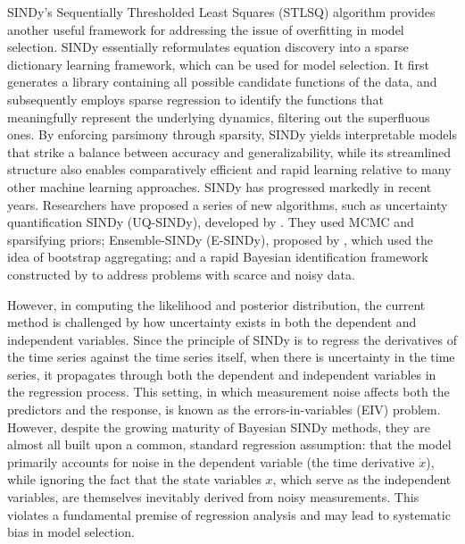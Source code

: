 SINDy’s Sequentially Thresholded Least Squares (STLSQ) algorithm provides another useful framework for addressing the issue of overfitting in model selection. SINDy essentially reformulates equation discovery into a sparse dictionary learning framework, which can be used for model selection. 
It first generates a library containing all possible candidate functions of the data, and subsequently employs sparse regression to identify the functions that meaningfully represent the underlying dynamics, filtering out the superfluous ones. By enforcing parsimony through sparsity, SINDy yields interpretable models that strike a balance between accuracy and generalizability, while its streamlined structure also enables comparatively efficient and rapid learning relative to many other machine learning approaches.
SINDy has progressed markedly in recent years. Researchers have proposed a series of new algorithms, such as uncertainty quantification SINDy (UQ-SINDy), developed by \cite{hirsh2022}. They used MCMC and sparsifying priors; Ensemble-SINDy (E-SINDy), proposed by \cite{fasel2022}, which used the idea of bootstrap aggregating; and a rapid Bayesian identification framework constructed by \cite{fung2024} to address problems with scarce and noisy data. 


However, in computing the likelihood and posterior distribution, the current method is challenged by how uncertainty exists in both the dependent and independent variables. Since the principle of SINDy is to regress the derivatives of the time series against the time series itself, when there is uncertainty in the time series, it propagates through both the dependent and independent variables in the regression process. This setting, in which measurement noise affects both the predictors and the response, is known as the errors-in-variables (EIV) problem. 
However, despite the growing maturity of Bayesian SINDy methods, they are almost all built upon a common, standard regression assumption: that the model primarily accounts for noise in the dependent variable (the time derivative $\dot{x} $), while ignoring the fact that the state variables $x$, which serve as the independent variables, are themselves inevitably derived from noisy measurements. This violates a fundamental premise of regression analysis and may lead to systematic bias in model selection.


